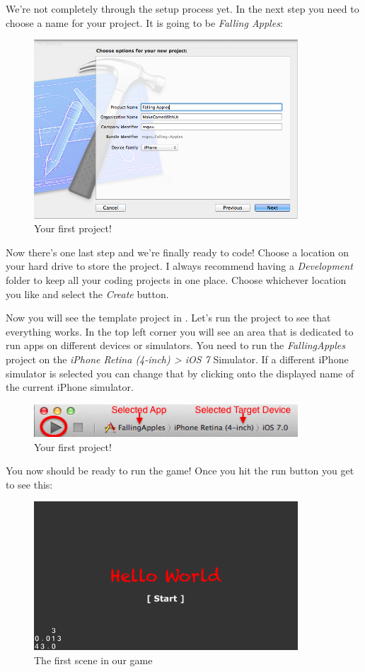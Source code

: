 We're not completely through the setup process yet. In the next step you need to
choose a name for your project. It is going to be \textit{Falling Apples}:

\begin{figure}[H]
		\centering
		\includegraphics[width=280pt]{images/sprites/xcode_fallingapples.png}     
		\caption{Your first \cocos{} project!}
\end{figure}

Now there's one last step and we're finally ready to code! Choose a location on
your hard drive to store the project. I always recommend having a
\textit{Development} folder to keep all your coding projects in one place.
Choose whichever location you like and select the \textit{Create} button.

Now you will see the \cocos{} template project in \xcode{}. Let's run the
project to see that everything works. In the top left corner you will see an
area that is dedicated to run apps on different devices or simulators. You need
to run the \textit{FallingApples} project on the \textit{iPhone Retina (4-inch)
> iOS 7} Simulator. If a different iPhone simulator is selected you can change
that by clicking onto the displayed name of the current iPhone simulator.

\begin{figure}[H]
		\centering
		\includegraphics[width=280pt]{images/sprites/run.png}     
		\caption{Your first \cocos{} project!}
\end{figure}


You now should be ready to run the game! Once you hit the run button you get to
see this:

\begin{figure}[H]
		\centering
		\includegraphics[width=280pt]{images/sprites/template_screenshot.png}     
		\caption{The first scene in our game}
\end{figure}

